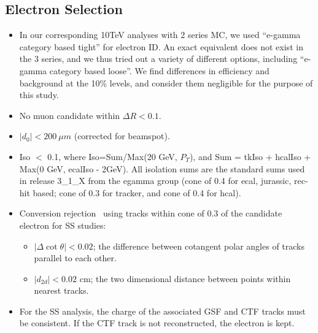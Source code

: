 \subsection{Electron Selection}
\label{sec:electron}

\begin{itemize}
\item In our corresponding 10TeV analyses with 2 series MC, we used ``e-gamma category based tight'' for electron ID.
      An exact equivalent does not exist in the 3 series, and we thus tried out a variety of different options, including ``e-gamma category based loose''.
      We find differences in efficiency and background at the 10\% levels, and consider them negligible for the purpose of this study.
\item No muon candidate within $\Delta R < 0.1$.
\item $|d_0| < 200~\mu m$ (corrected for beamspot).
\item Iso $<$ 0.1, where Iso=Sum/Max(20 GeV, $P_T$), and Sum = tkIso + hcalIso +  Max(0 GeV, ecalIso - 2GeV).
All isolation sums are the standard sums used in release 3\_1\_X from the egamma group (cone of
0.4 for ecal, jurassic, rec-hit based; cone of 0.3 for tracker, and cone of 0.4 for hcal).
\item Conversion rejection~\cite{conversionnote} using tracks within cone of 0.3 of the candidate electron for SS studies: 
\begin{itemize}
\item $|\Delta \cot\theta| < 0.02$; the difference between cotangent polar angles of tracks parallel to 
each other.
\item $|d_{2d}| < 0.02$ cm; the two dimensional distance between points within nearest tracks.
\end{itemize} 
\item For the SS analysis, the charge of the associated GSF and CTF tracks must be consistent.
If the CTF track is not reconstructed, the electron is kept.
\end{itemize}


